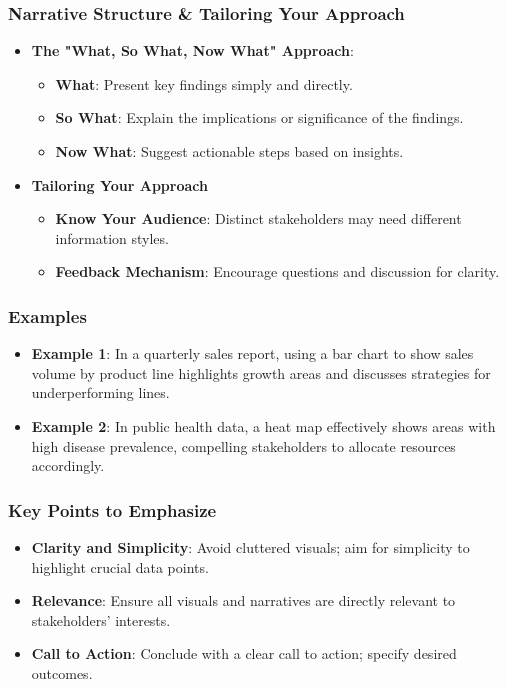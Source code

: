 \documentclass[aspectratio=169]{beamer}
\begin{document}
\begin{frame}[fragile]
    \frametitle{Narrative Structure \& Tailoring Your Approach}
    \begin{itemize}
        \item \textbf{The "What, So What, Now What" Approach}:
            \begin{itemize}
                \item \textbf{What}: Present key findings simply and directly.
                \item \textbf{So What}: Explain the implications or significance of the findings.
                \item \textbf{Now What}: Suggest actionable steps based on insights.
            \end{itemize}

        \item \textbf{Tailoring Your Approach}
            \begin{itemize}
                \item \textbf{Know Your Audience}: Distinct stakeholders may need different information styles.
                \item \textbf{Feedback Mechanism}: Encourage questions and discussion for clarity.
            \end{itemize}
    \end{itemize}
\end{frame}

\begin{frame}[fragile]
    \frametitle{Examples}
    \begin{itemize}
        \item \textbf{Example 1}: In a quarterly sales report, using a bar chart to show sales volume by product line highlights growth areas and discusses strategies for underperforming lines.
        
        \item \textbf{Example 2}: In public health data, a heat map effectively shows areas with high disease prevalence, compelling stakeholders to allocate resources accordingly.
    \end{itemize}
\end{frame}

\begin{frame}[fragile]
    \frametitle{Key Points to Emphasize}
    \begin{itemize}
        \item \textbf{Clarity and Simplicity}: Avoid cluttered visuals; aim for simplicity to highlight crucial data points.
        \item \textbf{Relevance}: Ensure all visuals and narratives are directly relevant to stakeholders’ interests.
        \item \textbf{Call to Action}: Conclude with a clear call to action; specify desired outcomes.
    \end{itemize}
\end{frame}
\end{document}
